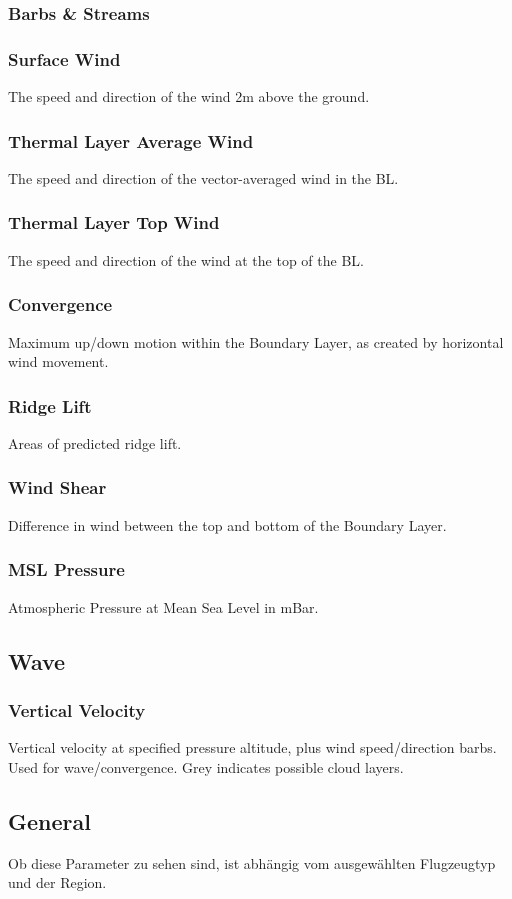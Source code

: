 \documentclass[11pt,a4paper]{article}
\begin{document}
\subsubsection{Barbs \& Streams}
\subsubsection{Surface Wind}
The speed and direction of the wind 2m above the ground.
\subsubsection{Thermal Layer Average Wind}
The speed and direction of the vector-averaged wind in the BL.
\subsubsection{Thermal Layer Top Wind}
The speed and direction of the wind at the top of the BL.
\subsubsection{Convergence}
Maximum up/down motion within the Boundary Layer, as created by horizontal wind movement.
\subsubsection{Ridge Lift}
Areas of predicted ridge lift.
\subsubsection{Wind Shear}
Difference in wind between the top and bottom of the Boundary Layer.
\subsubsection{MSL Pressure}
Atmospheric Pressure at Mean Sea Level in mBar.
\subsection{Wave}
\subsubsection{Vertical Velocity}
Vertical velocity at specified pressure altitude, plus wind speed/direction barbs. Used for wave/convergence. Grey indicates possible cloud layers.

\subsection{General}
Ob diese Parameter zu sehen sind, ist abhängig vom ausgewählten Flugzeugtyp und der Region.
\end{document}
